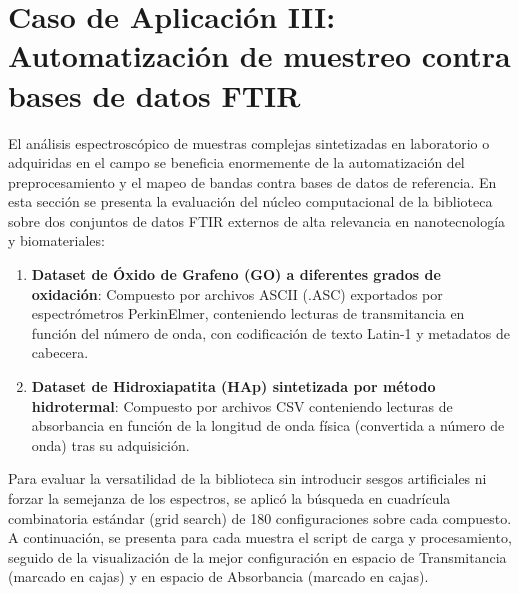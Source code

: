 \section{Caso de Aplicación III: Automatización de muestreo contra bases de datos FTIR}
El análisis espectroscópico de muestras complejas sintetizadas en laboratorio o adquiridas en el campo se beneficia enormemente de la automatización del preprocesamiento y el mapeo de bandas contra bases de datos de referencia. En esta sección se presenta la evaluación del núcleo computacional de la biblioteca sobre dos conjuntos de datos FTIR externos de alta relevancia en nanotecnología y biomateriales:

\begin{enumerate}
    \item \textbf{Dataset de Óxido de Grafeno (GO) a diferentes grados de oxidación}: Compuesto por archivos ASCII (.ASC) exportados por espectrómetros PerkinElmer, conteniendo lecturas de transmitancia en función del número de onda, con codificación de texto Latin-1 y metadatos de cabecera.
    \item \textbf{Dataset de Hidroxiapatita (HAp) sintetizada por método hidrotermal}: Compuesto por archivos CSV conteniendo lecturas de absorbancia en función de la longitud de onda física (convertida a número de onda) tras su adquisición.
\end{enumerate}

Para evaluar la versatilidad de la biblioteca sin introducir sesgos artificiales ni forzar la semejanza de los espectros, se aplicó la búsqueda en cuadrícula combinatoria estándar (grid search) de 180 configuraciones sobre cada compuesto. A continuación, se presenta para cada muestra el script de carga y procesamiento, seguido de la visualización de la mejor configuración en espacio de Transmitancia (marcado en cajas) y en espacio de Absorbancia (marcado en cajas).

\vspace{0.4cm}

